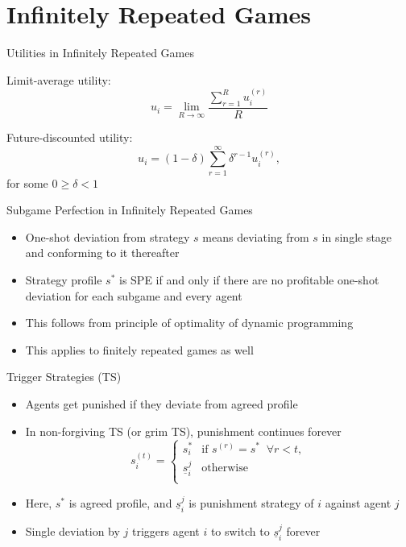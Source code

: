 \documentclass[11pt,aspectratio=169,handout]{beamer}
\begin{document}
 \section{Infinitely Repeated Games}
 
  \begin{frame}{Utilities in Infinitely Repeated Games}
   \begin{itemizes}[2em]
    \item \alert{Limit-average utility}: 
    $$u_i = \lim_{R\rightarrow\infty}\frac{\sum_{r=1}^{R}u_i^{(r)}}{R}$$
    \item \alert{Future-discounted utility}: 
    $$u_i = (1 - \delta) \sum_{r=1}^{\infty}\delta^{r-1} u_i^{(r)},$$
    for some $0 \ge \delta < 1$
   \end{itemizes}
  \end{frame}
  
  
  \begin{frame}{Subgame Perfection in Infinitely Repeated Games}
   \begin{itemize}
   \setlength{\itemsep}{2em}
    \item \alert{One-shot deviation} from strategy $s$ means deviating from $s$ in single stage and conforming to it thereafter
    \item Strategy profile $s^*$ is SPE \alert{if and only if} there are no \alert{profitable} one-shot deviation for \alert{each subgame} and \alert{every agent}
    \item This follows from principle of optimality of \alert{dynamic programming}
    \item This applies to finitely repeated games as well
   \end{itemize}
  \end{frame}

  \begin{frame}{Trigger Strategies (TS)}
   \begin{itemize}
    \item Agents get \alert{punished} if they deviate from agreed profile
    \item In \alert{non-forgiving} TS (or grim TS), punishment continues forever
    $$ 
    s_i^{(t)}=\begin{cases}
                  s_i^* &\text{if } s^{(r)} = s^* \;\; \forall r<t,\\
                  \underline{s}_{i}^{j} &\text{otherwise}\\
                 \end{cases}
    $$
    \item Here, $s^{*}$ is agreed profile, and $\underline{s}_{i}^{j}$ is punishment strategy of $i$ against agent $j$
    \item Single deviation by $j$ triggers agent $i$ to switch to $\underline{s}_{i}^{j}$ \alert{forever}
   \end{itemize}
  \end{frame}
\end{document}
